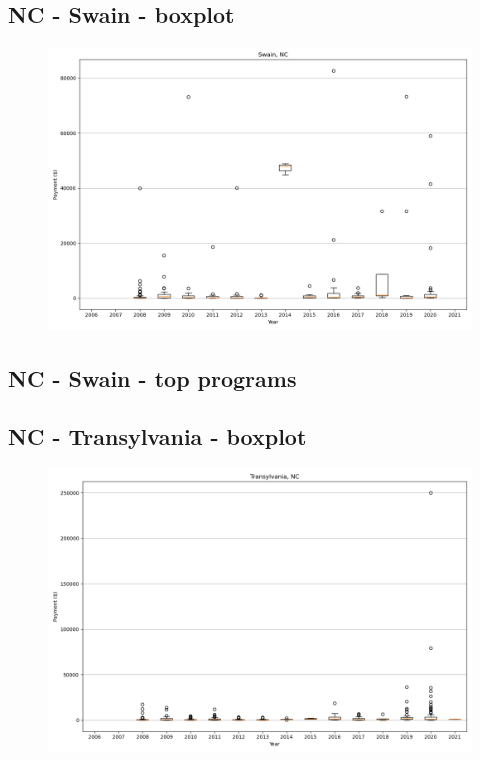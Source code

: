 \subsection*{NC - Swain - boxplot}
\begin{figure}[h]
\centering
\includegraphics[width=7in]{../output/boxplots/counties/Swain-NC_boxplot.png}
\end{figure}


\subsection*{NC - Swain - top programs}

\newpage
\subsection*{NC - Transylvania - boxplot}
\begin{figure}[h]
\centering
\includegraphics[width=7in]{../output/boxplots/counties/Transylvania-NC_boxplot.png}
\end{figure}


